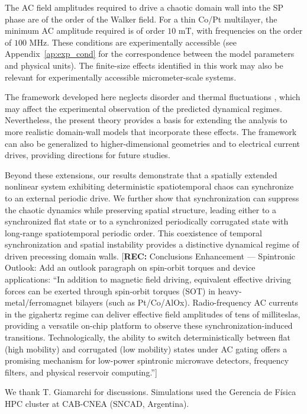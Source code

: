 \documentclass[prb,aps,twocolumn,superscriptaddress,floatfix]{revtex4-1}
\newcommand{\rec}[1]{{\color{magenta}[\textbf{REC:} #1]}}
\begin{document}
The AC field amplitudes required to drive a chaotic domain wall into the SP phase are of the order of the Walker field. For a thin Co/Pt multilayer, the minimum AC amplitude required is of order $10$ mT, with frequencies on the order of $100$ MHz. These conditions are experimentally accessible (see Appendix~\ref{ap:exp_cond} for the correspondence between the model parameters and physical units). The finite-size effects identified in this work may also be relevant for experimentally accessible micrometer-scale systems.

The framework developed here neglects disorder and thermal fluctuations \cite{ferre2013,ferrero2021creep}, which may affect the experimental observation of the predicted dynamical regimes. Nevertheless, the present theory provides a basis for extending the analysis to more realistic domain-wall models that incorporate these effects. The framework can also be generalized to higher-dimensional geometries and to electrical current drives, providing directions for future studies.

Beyond these extensions, our results demonstrate that a spatially extended nonlinear system exhibiting deterministic spatiotemporal chaos can synchronize to an external periodic drive. We further show that synchronization can suppress the chaotic dynamics while preserving spatial structure, leading either to a synchronized flat state or to a synchronized periodically corrugated state with long-range spatiotemporal periodic order. This coexistence of temporal synchronization and spatial instability provides a distinctive dynamical regime of driven precessing domain walls.
\rec{Conclusions Enhancement --- Spintronic Outlook: Add an outlook paragraph on spin-orbit torques and device applications: ``In addition to magnetic field driving, equivalent effective driving forces can be exerted through spin-orbit torques (SOT) in heavy-metal/ferromagnet bilayers (such as Pt/Co/AlOx). Radio-frequency AC currents in the gigahertz regime can deliver effective field amplitudes of tens of milliteslas, providing a versatile on-chip platform to observe these synchronization-induced transitions. Technologically, the ability to switch deterministically between flat (high mobility) and corrugated (low mobility) states under AC gating offers a promising mechanism for low-power spintronic microwave detectors, frequency filters, and physical reservoir computing.''}

\begin{acknowledgments}
We thank T. Giamarchi for discussions. Simulations used the Gerencia de Física  HPC cluster at CAB-CNEA (SNCAD, Argentina).
\end{acknowledgments}
\end{document}
